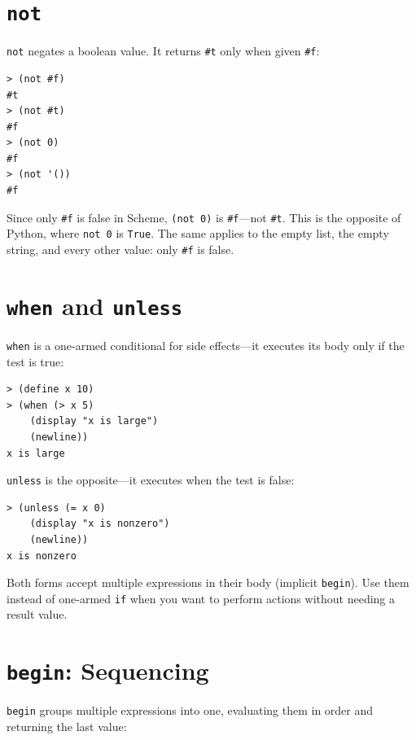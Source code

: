 \section{\texttt{not}}

\texttt{not} negates a boolean value. It returns \texttt{\#t} only when given \texttt{\#f}:

\begin{lstlisting}[style=repl]
> (not #f)
#t
> (not #t)
#f
> (not 0)
#f
> (not '())
#f
\end{lstlisting}

\begin{warning}
Since only \texttt{\#f} is false in Scheme, \texttt{(not 0)} is \texttt{\#f}---not \texttt{\#t}. This is the opposite of Python, where \texttt{not 0} is \texttt{True}. The same applies to the empty list, the empty string, and every other value: only \texttt{\#f} is false.
\end{warning}

\section{\texttt{when} and \texttt{unless}}

\texttt{when} is a one-armed conditional for side effects---it executes its body only if the test is true:

\begin{lstlisting}[style=repl]
> (define x 10)
> (when (> x 5)
    (display "x is large")
    (newline))
x is large
\end{lstlisting}

\texttt{unless} is the opposite---it executes when the test is false:

\begin{lstlisting}[style=repl]
> (unless (= x 0)
    (display "x is nonzero")
    (newline))
x is nonzero
\end{lstlisting}

Both forms accept multiple expressions in their body (implicit \texttt{begin}). Use them instead of one-armed \texttt{if} when you want to perform actions without needing a result value.

\section{\texttt{begin}: Sequencing}

\texttt{begin} groups multiple expressions into one, evaluating them in order and returning the last value:

